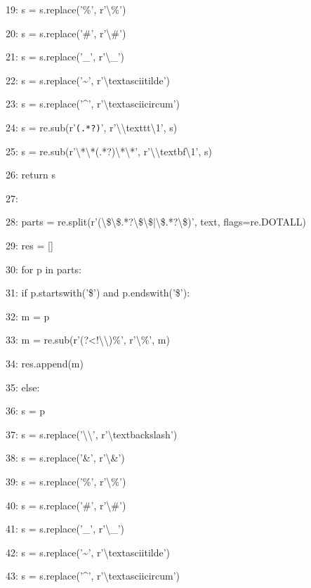 \documentclass[11pt,a4paper]{article}
\begin{document}
19:         s = s.replace('\%', r'\textbackslash{}\%')

20:         s = s.replace('\#', r'\textbackslash{}\#')

21:         s = s.replace('\_', r'\textbackslash{}\_')

22:         s = s.replace('\textasciitilde{}', r'\textbackslash{}textasciitilde{}')

23:         s = s.replace('\textasciicircum{}', r'\textbackslash{}textasciicircum{}')

24:         s = re.sub(r'\texttt{(.*?)}', r'\textbackslash{}\textbackslash{}texttt{\textbackslash{}1}', s)

25:         s = re.sub(r'\textbackslash{}*\textbackslash{}*(.*?)\textbackslash{}*\textbackslash{}*', r'\textbackslash{}\textbackslash{}textbf{\textbackslash{}1}', s)

26:         return s

27:

28:     parts = re.split(r'(\textbackslash{}\$\textbackslash{}\$.*?\textbackslash{}\$\textbackslash{}\$|\textbackslash{}\$.*?\textbackslash{}\$)', text, flags=re.DOTALL)

29:     res = []

30:     for p in parts:

31:         if p.startswith('\$') and p.endswith('\$'):

32:             m = p

33:             m = re.sub(r'(?<!\textbackslash{}\textbackslash{})\%', r'\textbackslash{}\%', m)

34:             res.append(m)

35:         else:

36:             s = p

37:             s = s.replace('\textbackslash{}\textbackslash{}', r'\textbackslash{}textbackslash{}')

38:             s = s.replace('\&', r'\textbackslash{}\&')

39:             s = s.replace('\%', r'\textbackslash{}\%')

40:             s = s.replace('\#', r'\textbackslash{}\#')

41:             s = s.replace('\_', r'\textbackslash{}\_')

42:             s = s.replace('\textasciitilde{}', r'\textbackslash{}textasciitilde{}')

43:             s = s.replace('\textasciicircum{}', r'\textbackslash{}textasciicircum{}')
\end{document}
